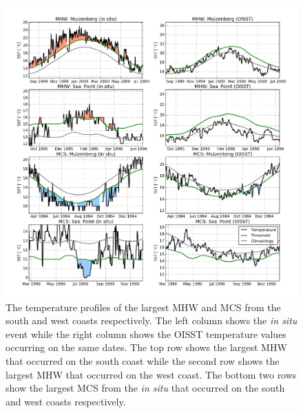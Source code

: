 \documentclass[a4paper,10pt,review]{elsarticle}
\begin{document}
\begin{figure}
\centering \includegraphics[width=1.0\textwidth]{figure3.png}
\caption{The temperature profiles of the largest MHW and MCS from the south and west coasts respectively. The left column shows the \emph{in situ} event while the right column shows the OISST temperature values occurring on the same dates. The top row shows the largest MHW that occurred on the south coast while the second row shows the largest MHW that occurred on the west coast. The bottom two rows show the largest MCS from the \emph{in situ} that occurred on the south and west coasts respectively.} \label{fig:Figure3}
\end{figure}
\end{document}
